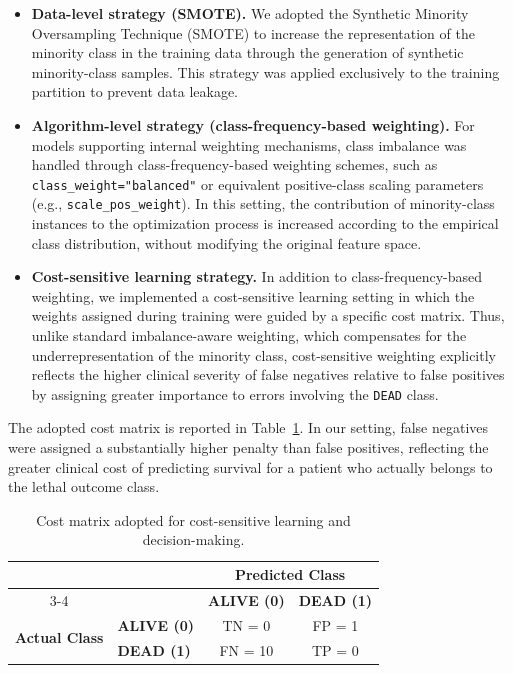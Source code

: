 \documentclass[conference]{IEEEtran}
\begin{document}
\begin{itemize}
    \item \textbf{Data-level strategy (SMOTE).}  
    We adopted the Synthetic Minority Oversampling Technique (SMOTE) to increase the representation of the minority class in the training data through the generation of synthetic minority-class samples. This strategy was applied exclusively to the training partition to prevent data leakage.

    \item \textbf{Algorithm-level strategy (class-frequency-based weighting).}  
    For models supporting internal weighting mechanisms, class imbalance was handled through class-frequency-based weighting schemes, such as \texttt{class\_weight="balanced"} or equivalent positive-class scaling parameters (e.g., \texttt{scale\_pos\_weight}). In this setting, the contribution of minority-class instances to the optimization process is increased according to the empirical class distribution, without modifying the original feature space.

    \item \textbf{Cost-sensitive learning strategy.}  
    In addition to class-frequency-based weighting, we implemented a cost-sensitive learning setting in which the weights assigned during training were guided by a specific cost matrix. Thus, unlike standard imbalance-aware weighting, which compensates for the underrepresentation of the minority class, cost-sensitive weighting explicitly reflects the higher clinical severity of false negatives relative to false positives by assigning greater importance to errors involving the \texttt{DEAD} class.
\end{itemize}

The adopted cost matrix is reported in Table~\ref{tab:cost-matrix}. In our setting, false negatives were assigned a substantially higher penalty than false positives, reflecting the greater clinical cost of predicting survival for a patient who actually belongs to the lethal outcome class.

\begin{table}[h]
    \centering
    \caption{Cost matrix adopted for cost-sensitive learning and decision-making.}
    \label{tab:cost-matrix}
    \begin{threeparttable}
        \begin{tabular}{clcc}
            \toprule
            & & \multicolumn{2}{c}{\textbf{Predicted Class}} \\
            \cmidrule(lr){3-4}
            & & \textbf{ALIVE (0)} & \textbf{DEAD (1)} \\
            \midrule
            \multirow{2}{*}{{\textbf{Actual Class}}} 
            & \textbf{ALIVE (0)} & TN = 0 & FP = 1 \\
            & \textbf{DEAD (1)}  & FN = 10 & TP = 0 \\
            \bottomrule
        \end{tabular}
    \end{threeparttable}
\end{table}
\end{document}
